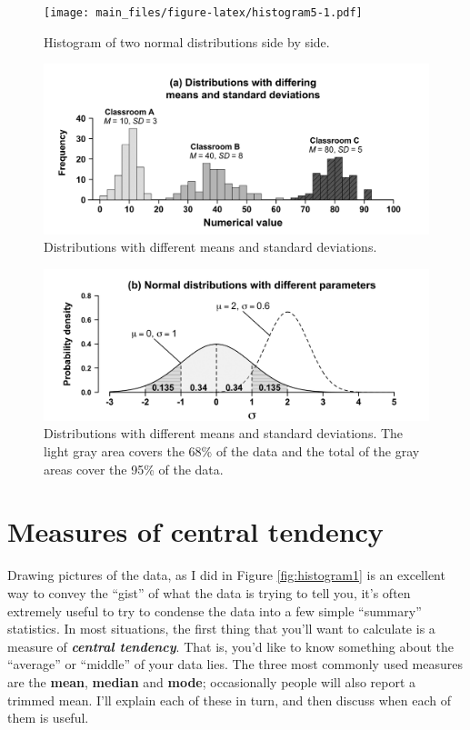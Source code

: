 \documentclass[
]{book}
\begin{document}
\begin{figure}
\centering
\texttt{[image: main\_files/figure-latex/histogram5-1.pdf]}
\caption{\label{fig:histogram5}Histogram of two normal distributions side by side.}
\end{figure}

\begin{figure}
\centering
\includegraphics{./img/descriptives2/data_distribution.png}
\caption{\label{fig:normaldatadistributions}Distributions with different means and standard deviations.}
\end{figure}

\begin{figure}
\centering
\includegraphics{./img/descriptives2/normal_distribution.png}
\caption{\label{fig:normalparameterdistributions}Distributions with different means and standard deviations. The light gray area covers the 68\% of the data and the total of the gray areas cover the 95\% of the data.}
\end{figure}

\hypertarget{centraltendency}{%
\section{Measures of central tendency}\label{centraltendency}}

Drawing pictures of the data, as I did in Figure \ref{fig:histogram1} is an excellent way to convey the ``gist'' of what the data is trying to tell you, it's often extremely useful to try to condense the data into a few simple ``summary'' statistics. In most situations, the first thing that you'll want to calculate is a measure of \textbf{\emph{central tendency}}. That is, you'd like to know something about the ``average'' or ``middle'' of your data lies. The three most commonly used measures are the \textbf{mean}, \textbf{median} and \textbf{mode}; occasionally people will also report a trimmed mean. I'll explain each of these in turn, and then discuss when each of them is useful.
\end{document}
